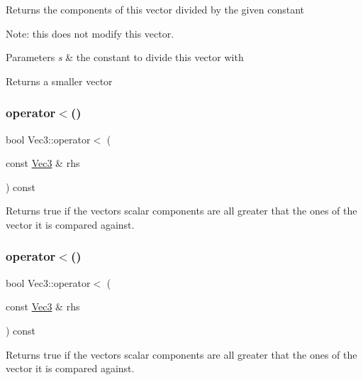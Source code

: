 Returns the components of this vector divided by the given constant

Note\+: this does not modify this vector.


\begin{DoxyParams}{Parameters}
{\em s} & the constant to divide this vector with \\
\hline
\end{DoxyParams}
\begin{DoxyReturn}{Returns}
a smaller vector 
\end{DoxyReturn}
\mbox{\label{classVec3_a04aee1e04130243be776af6e44d6cb50}} 
\subsubsection{\texorpdfstring{operator$<$()}{operator<()}\hspace{0.1cm}{\footnotesize\ttfamily [1/2]}}
{\footnotesize\ttfamily bool Vec3\+::operator$<$ (\begin{DoxyParamCaption}\item[{const \hyperlink{classVec3}{Vec3} \&}]{rhs }\end{DoxyParamCaption}) const\hspace{0.3cm}{\ttfamily [inline]}}

Returns true if the vector\textquotesingle{}s scalar components are all greater that the ones of the vector it is compared against. \mbox{\label{classVec3_a04aee1e04130243be776af6e44d6cb50}} 
\subsubsection{\texorpdfstring{operator$<$()}{operator<()}\hspace{0.1cm}{\footnotesize\ttfamily [2/2]}}
{\footnotesize\ttfamily bool Vec3\+::operator$<$ (\begin{DoxyParamCaption}\item[{const \hyperlink{classVec3}{Vec3} \&}]{rhs }\end{DoxyParamCaption}) const\hspace{0.3cm}{\ttfamily [inline]}}

Returns true if the vector\textquotesingle{}s scalar components are all greater that the ones of the vector it is compared against. \mbox{\label{classVec3_a9316a906e2b490aa9405bc17adc0078c}} 
